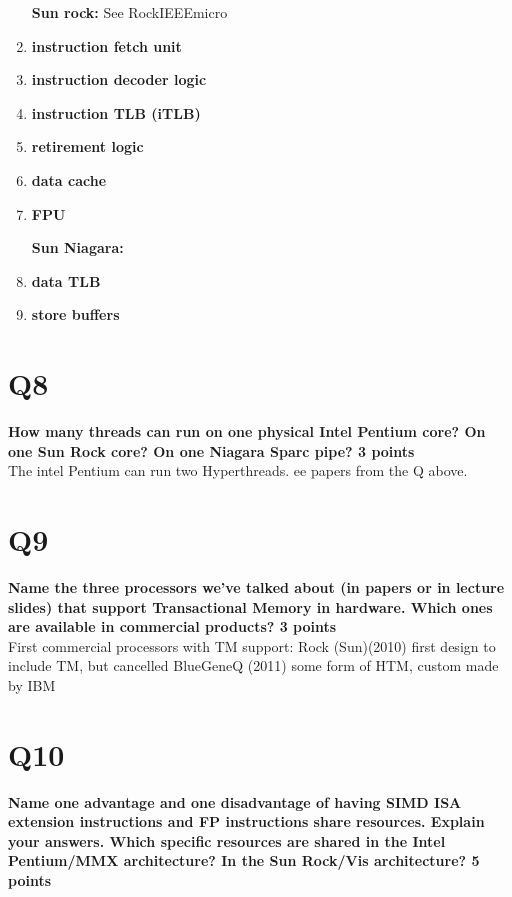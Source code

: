 \documentclass[a4paper]{article}
\begin{document}
\begin{enumerate}
\textbf{Sun rock:}
    See RockIEEEmicro
\item
\textbf{instruction fetch unit\\}
\item
\textbf{instruction decoder logic\\}
\item
\textbf{instruction TLB (iTLB)\\}
\item
\textbf{retirement logic\\}
\item
\textbf{data cache\\}
\item
\textbf{FPU\\}

\textbf{Sun Niagara:}
\item
\textbf{data TLB\\}
\item
\textbf{store buffers\\}
\end{enumerate}
\section*{Q8}
\large{\textbf{
How many threads can run on one physical Intel Pentium core? On one Sun Rock core? On one Niagara Sparc pipe? 3 points\\}}
The intel Pentium can run two Hyperthreads. ee papers from the Q above.

\section*{Q9}
\large{\textbf{
Name the three processors we’ve talked about (in papers or in lecture slides) that support Transactional Memory in hardware. Which ones are available in commercial products? 3 points\\}}
First commercial processors with TM support:
Rock (Sun)(2010) first design to include TM, but cancelled
BlueGeneQ (2011) some form of HTM, custom made by IBM

\section*{Q10}
\large{\textbf{
Name one     advantage and one disadvantage of having SIMD ISA extension instructions and FP instructions share resources. Explain your answers. Which specific resources are shared in the Intel     Pentium/MMX architecture? In the Sun Rock/Vis architecture? 5 points\\}}
\end{document}
